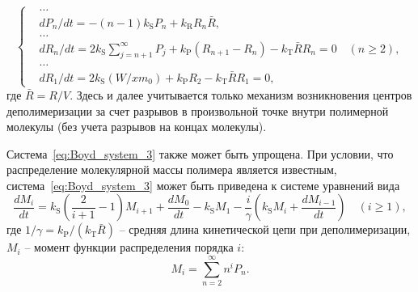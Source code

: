 \begin{equation} \label{eq:Boyd_system_3}
	\left\{
	\begin{aligned}
		&\dots \\
		&d P_n / d t=-(n-1) k_\mathrm{S} P_n + k_\mathrm{R} R_n \bar{R}, \\
		&\dots \\
		&d R_n / d t=2 k_\mathrm{S} \sum_{j=n+1}^{\infty} P_j + k_\mathrm{P}\left(R_{n+1} - R_n\right) - k_\mathrm{T} \bar{R} R_n=0 \quad(n \geq 2), \\
		&\dots \\
		&d R_1 / d t = 2 k_\mathrm{S} \left(W / x m_0\right) + k_\mathrm{P} R_2 - k_\mathrm{T} \bar{R} R_1=0,
	\end{aligned}
	\right.
\end{equation}
где $\bar{R} = R/V$. Здесь и далее учитывается только механизм возникновения центров деполимеризации за счет разрывов в произвольной точке внутри полимерной молекулы (без учета разрывов на концах молекулы).

Система~\ref{eq:Boyd_system_3} также может быть упрощена. При условии, что распределение молекулярной массы полимера является известным, система~\ref{eq:Boyd_system_3} может быть приведена к системе уравнений вида~\cite{Boyd_3}
\begin{equation} \label{eq:moment_equation}
	\frac{d M_i}{d t} = k_\mathrm{S} \left(\frac{2}{i+1} - 1\right) M_{i+1} + \frac{d M_0}{d t} - k_\mathrm{S} M_1 - \frac{i}{\gamma}\left(k_\mathrm{S} M_i + \frac{d M_{i-1}}{dt}\right) \quad(i \geq 1),
\end{equation}
где $1/\gamma = k_\mathrm{P} / (k_\mathrm{T} \bar{R})$ -- средняя длина кинетической цепи при деполимеризации, $M_i$ -- момент функции распределения порядка $i$:
\begin{equation}
	M_i=\sum_{n=2}^{\infty} n^i P_n.
\end{equation}

